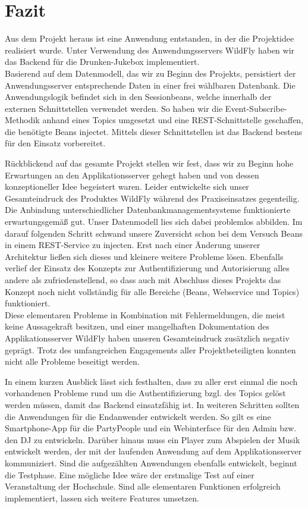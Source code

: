\section{Fazit}
Aus dem Projekt heraus ist eine Anwendung entstanden, in der die Projektidee realisiert wurde. Unter Verwendung des Anwendungsservers WildFly haben wir das Backend für die Drunken-Jukebox implementiert.\\
Basierend auf dem Datenmodell, das wir zu Beginn des Projekts, persistiert der Anwendungsserver entsprechende Daten in einer frei wählbaren Datenbank. Die Anwendungslogik befindet sich in den Sessionbeans, welche innerhalb der externen Schnittstellen verwendet werden. So haben wir die Event-Subscribe-Methodik anhand eines Topics umgesetzt und eine REST-Schnittstelle geschaffen, die benötigte Beans injectet. Mittels dieser Schnittstellen ist das Backend bestens für den Einsatz vorbereitet. 

Rückblickend auf das gesamte Projekt stellen wir fest, dass wir zu Beginn hohe Erwartungen an den Applikationsserver gehegt haben und von dessen konzeptioneller Idee begeistert waren. Leider entwickelte sich unser Gesamteindruck des Produktes WildFly während des Praxiseinsatzes gegenteilig. \\
Die Anbindung unterschiedlicher Datenbankmanagementsysteme funktionierte erwartungsgemäß gut. Unser Datenmodell lies sich dabei problemlos abbilden. Im darauf folgenden Schritt schwand unsere Zuversicht schon bei dem Versuch Beans in einem REST-Service zu injecten. Erst nach einer Änderung unserer Architektur ließen sich dieses und kleinere weitere Probleme lösen. Ebenfalls verlief der Einsatz des Konzepts zur Authentifizierung und Autorisierung alles andere als zufriedenstellend, so dass auch mit Abschluss dieses Projekts das Konzept noch nicht vollständig für alle Bereiche (Beans, Webservice und Topics) funktioniert.\\
Diese elementaren Probleme in Kombination mit Fehlermeldungen, die meist keine Aussagekraft besitzen, und einer mangelhaften Dokumentation des Applikationsserver WildFly haben unseren Gesamteindruck zusätzlich negativ geprägt. Trotz des umfangreichen Engagements aller Projektbeteiligten konnten nicht alle Probleme beseitigt werden.

In einem kurzen Ausblick lässt sich festhalten, dass zu aller erst einmal die noch vorhandenen Probleme rund um die Authentifizierung bzgl. des Topics gelöst werden müssen, damit das Backend einsatzfähig ist. In weiteren Schritten sollten die Anwendungen für die Endanwender entwickelt werden. So gilt es eine Smartphone-App für die PartyPeople und ein Webinterface für den Admin bzw. den DJ zu entwickeln. Darüber hinaus muss ein Player zum Abspielen der Musik entwickelt werden, der mit der laufenden Anwendung auf dem Applikationsserver kommuniziert.
Sind die aufgezählten Anwendungen ebenfalls entwickelt, beginnt die Testphase. Eine mögliche Idee wäre der erstmalige Test auf einer Veranstaltung der Hochschule. Sind alle elementaren Funktionen erfolgreich implementiert, lassen sich weitere Features umsetzen.